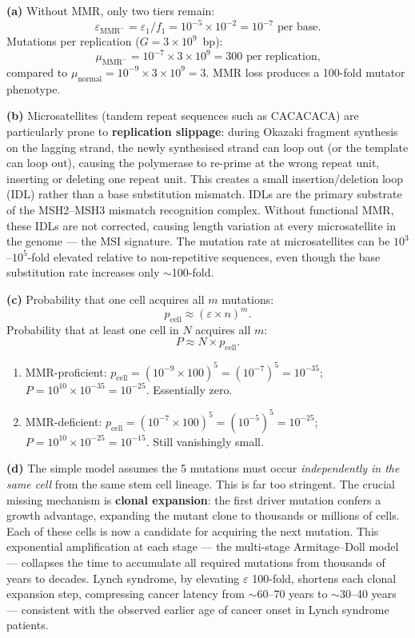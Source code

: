 \documentclass[12pt, a4paper, oneside]{report}
\begin{document}
\begin{solution}
  \textbf{(a)} Without MMR, only two tiers remain:
  \[
    \varepsilon_{\text{MMR}^-}
    = \varepsilon_1 / f_1
    = 10^{-5} \times 10^{-2}
    = 10^{-7} \text{ per base.}
  \]
  Mutations per replication ($G = 3\times10^9$~bp):
  \[
    \mu_{\text{MMR}^-} = 10^{-7} \times 3\times10^9 = 300 \text{ per replication,}
  \]
  compared to $\mu_\text{normal} = 10^{-9} \times 3\times10^9 = 3$.
  MMR loss produces a 100-fold mutator phenotype.

  \textbf{(b)} Microsatellites (tandem repeat sequences such as CACACACA)
  are particularly prone to \textbf{replication slippage}: during Okazaki
  fragment synthesis on the lagging strand, the newly synthesised strand
  can loop out (or the template can loop out), causing the polymerase to
  re-prime at the wrong repeat unit, inserting or deleting one repeat
  unit. This creates a small insertion/deletion loop (IDL) rather than a
  base substitution mismatch. IDLs are the primary substrate of the
  MSH2--MSH3 mismatch recognition complex. Without functional MMR,
  these IDLs are not corrected, causing length variation at every
  microsatellite in the genome — the MSI signature. The mutation rate
  at microsatellites can be $10^3$--$10^5$-fold elevated relative to
  non-repetitive sequences, even though the base substitution rate
  increases only $\sim$100-fold.

  \textbf{(c)} Probability that one cell acquires all $m$ mutations:
  \[
    p_\text{cell} \approx (\varepsilon \times n)^m.
  \]
  Probability that at least one cell in $N$ acquires all $m$:
  \[
    P \approx N \times p_\text{cell}.
  \]
  \begin{enumerate}[label=(\roman*)]
    \item MMR-proficient: $p_\text{cell} = (10^{-9}\times100)^5 = (10^{-7})^5 = 10^{-35}$;
          $P = 10^{10} \times 10^{-35} = 10^{-25}$. Essentially zero.
    \item MMR-deficient: $p_\text{cell} = (10^{-7}\times100)^5 = (10^{-5})^5 = 10^{-25}$;
          $P = 10^{10} \times 10^{-25} = 10^{-15}$. Still vanishingly small.
  \end{enumerate}

  \textbf{(d)} The simple model assumes the 5 mutations must occur
  \emph{independently in the same cell} from the same stem cell lineage.
  This is far too stringent. The crucial missing mechanism is
  \textbf{clonal expansion}: the first driver mutation confers a
  growth advantage, expanding the mutant clone to thousands or millions
  of cells. Each of these cells is now a candidate for acquiring the
  next mutation. This exponential amplification at each stage — the
  multi-stage Armitage--Doll model — collapses the time to accumulate
  all required mutations from thousands of years to decades.
  Lynch syndrome, by elevating $\varepsilon$ 100-fold, shortens each
  clonal expansion step, compressing cancer latency from $\sim$60--70
  years to $\sim$30--40 years — consistent with the observed earlier
  age of cancer onset in Lynch syndrome patients.
\end{solution}

\end{document}
